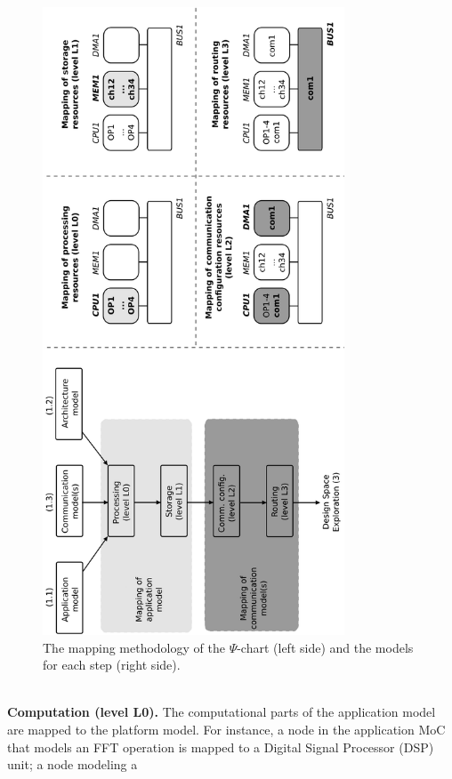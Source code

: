 \documentclass{llncs}
\begin{document}
\begin{figure}[htbp]
	\centering
	\includegraphics[angle=-90,origin=c,width=0.8\textwidth]{figures/applicationModel1.pdf}
	\vspace{-10em}
	\caption{The mapping methodology of the $\Psi$-chart (left side) and the models for each step (right side).}
	\label{fig:MappingMeth}
\end{figure}
%
\\\textbf{Computation (level L0).}
%
The computational parts of the application model are mapped to the platform model. For instance, a node in the
application MoC that models an FFT operation is mapped to a Digital Signal Processor (DSP) unit; a node modeling a
\end{document}
